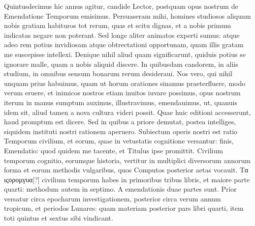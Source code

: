 \setcounter{parcount}{0}
\begin{parnumbers}
Quintusdecimus hic annus agitur, candide
Lector, postquam opus nostrum de
Emendatione Temporum emisimus.
Persuaseram
mihi, homines studiosos aliquam nobis
gratiam habituros tot rerum, quas et scitu
dignas, et a nobis primum indicatas negare
non poterant.
Sed longe aliter animatos experti
sumus: atque adeo rem potius invidiosam
atque obtrectationi opportunam, quam illis gratam me suscepisse
intellexi.
Denique nihil aliud quam significarunt, quiduis potius
se ignorare malle, quam a nobis aliquid discere.
In quibusdam
candorem, in aliis studium, in omnibus sensum bonarum rerum desideraui.
Nos vero, qui nihil unquam prius habuimus, quam ut horum
orationes sinamus praeterfluere, modo verum eruere, et inimicos
nostros etiam inuitos iuvare possimus, opus nostrum iterum in
manus sumptum auximus, illustravimus, emendauimus, ut, quanuis
idem sit, aliud tamen a nova cultura videri possit.
Quae huic editioni
accesserunt, haud promptum est dicere.
Sed in quibus a priore demutat,
postea intelliges, siquidem instituti nostri rationem aperuero.
Subiectum operis nostri est ratio Temporum civilium, et eorum,
quae in vetustatis cognitione versantur: finis, Emendatio: quod quidem
me tacente, et Titulus ipse promittit.
Civilium temporum cognitio,
eorumque historia, vertitur in multiplici diversorum annorum
forma et eorum methodis vulgaribus, quos Computos posterior
aetas vocauit.
\textgreek{Τα ιςορομγυα[?]} civilium temporum habes in primoribus
tribus libris, et maiore parte quarti: methodum autem in septimo.
A emendationis duae partes sunt.
{}
Prior versatur circa epocharum
investigationem, posterior circa verum annum tropicum, 
et periodos Lunares: quam materiam posterior pars libri quarti,
item toti quintus et sextus sibi vindicant.


\end{parnumbers}
